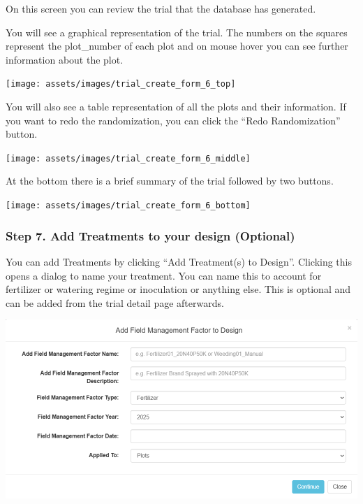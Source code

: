 \documentclass[
  12pt,
]{book}
\begin{document}
On this screen you can review the trial that the database has generated.

You will see a graphical representation of the trial. The numbers on the squares represent the plot\_number of each plot and on mouse hover you can see further information about the plot.

\begin{center}\texttt{[image: assets/images/trial\_create\_form\_6\_top]} \end{center}

You will also see a table representation of all the plots and their information. If you want to redo the randomization, you can click the ``Redo Randomization'' button.

\begin{center}\texttt{[image: assets/images/trial\_create\_form\_6\_middle]} \end{center}

At the bottom there is a brief summary of the trial followed by two buttons.

\begin{center}\texttt{[image: assets/images/trial\_create\_form\_6\_bottom]} \end{center}

\hypertarget{step-7.-add-treatments-to-your-design-optional}{%
\subsubsection*{Step 7. Add Treatments to your design (Optional)}\label{step-7.-add-treatments-to-your-design-optional}}


You can add Treatments by clicking ``Add Treatment(s) to Design''. Clicking this opens a dialog to name your treatment. You can name this to account for fertilizer or watering regime or inoculation or anything else. This is optional and can be added from the trial detail page afterwards.

\begin{center}\includegraphics[width=0.95\linewidth]{assets/images/add_management_factor_name_dialog} \end{center}
\end{document}
